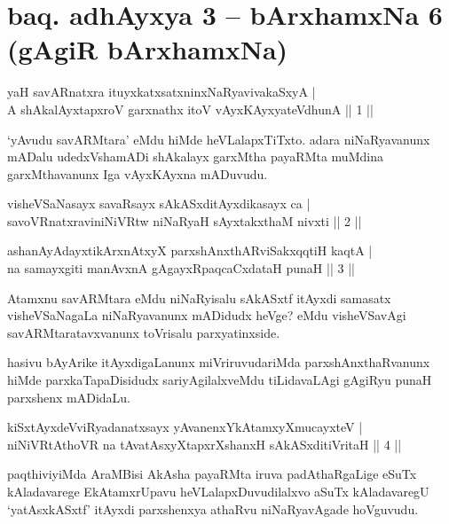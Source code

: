 
\section*{baq. adhAyxya 3 -- bArxhamxNa 6 (gAgiR bArxhamxNa)}%

\begin{shl}
yaH savARnatxra ituyxkatxsatxninxNaRyavivakaSxyA |\\
A shAkalAyxtapxroV garxnathx itoV vAyxKAyxyateV\s dhunA \hfill || 1 ||
\end{shl}

\begin{artha}
`yAvudu savARMtara' eMdu hiMde heVLalapxTiTxto. adara niNaRyavanunx mADalu udedxVshamADi shAkalayx garxMtha payaRMta muMdina garxMthavanunx Iga vAyxKAyxna mADuvudu.
\end{artha}

\begin{shl}
visheVSaNasayx savaRsayx sAkASxditAyxdikasayx ca |\\
savoVRnatxraviniNiVRtw niNaRyaH sAyxtakxthaM nivxti \hfill || 2 ||
\end{shl}

\begin{shl}
ashanAyAdayxtikArxnAtxyX parxshAnxthARviSakxqqtiH kaqtA |\\
na samayxgiti manAvxnA gAgayxRpaqcaCxdataH punaH \hfill || 3 ||
\end{shl}

\begin{artha}
Atamxnu savARMtara eMdu niNaRyisalu sAkASxtf itAyxdi samasatx visheVSaNagaLa niNaRyavanunx mADidudx heVge? eMdu visheVSavAgi savARMtaratavxvanunx toVrisalu parxyatinxside.

hasivu bAyArike itAyxdigaLanunx miVriruvudariMda parxshAnxthaRvanunx hiMde parxkaTapaDisidudx sariyAgilalxveMdu tiLidavaLAgi gAgiRyu punaH parxshenx mADidaLu.
\end{artha}


\begin{shl}
kiSxtAyxdeVviRyadanatxsayx yAvanenxYkAtamxyXmucayxteV |\\
niNiVRtAthoVR na tAvatAsxyXtapxrXshanxH sAkASxditiVritaH \hfill || 4 ||
\end{shl}

\begin{artha}
paqthiviyiMda AraMBisi AkAsha payaRMta iruva padAthaRgaLige eSuTx kAladavarege EkAtamxrUpavu heVLalapxDuvudilalxvo aSuTx kAladavaregU `yatAsxkASxtf' itAyxdi parxshenxya athaRvu niNaRyavAgade hoVguvudu.
\end{artha}

